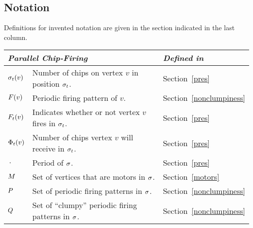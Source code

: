 \subsection*{Notation}
\newlength{\tablespace}
\setlength{\tablespace}{.3\baselineskip}
Definitions for invented notation are given in the section indicated in the
last column.\\

\showgame
\begin{centering}
  \begin{tabular}{l p{} l}
    \toprule
    \multicolumn{2}{l}{\emph{Parallel Chip-Firing}} & \emph{Defined in} \\
    \midrule

    $\chips{v}{t}$ & Number of chips on vertex $v$ in position $\pos{t}$. &
    Section~\ref{pres} \vspace{\tablespace}\\

    $\pfp{v}$ & Periodic firing pattern of $v$. & Section~\ref{nonclumpiness}
    \vspace{\tablespace}\\

    $\firing{v}{t}$ & Indicates whether or not vertex $v$ fires in $\pos{t}$. &
    Section~\ref{pres} \vspace{\tablespace}\\

    $\receiving{v}{t}$ & Number of chips vertex $v$ will receive in $\pos{t}$.
    & Section~\ref{pres} \vspace{\tablespace}\\

    $\period$ & Period of $\s$. & Section~\ref{pres} \vspace{\tablespace}\\

    $\mots$ & Set of vertices that are motors in $\s$. & Section~\ref{motors}
    \vspace{\tablespace}\\

    $\pfps$ & Set of periodic firing patterns in $\s$. &
    Section~\ref{nonclumpiness} \vspace{\tablespace}\\

    $\cpfps$ & Set of ``clumpy'' periodic firing patterns in $\s$. &
    Section~\ref{nonclumpiness} \vspace{\tablespace}\\


\end{tabular}
\end{centering}
